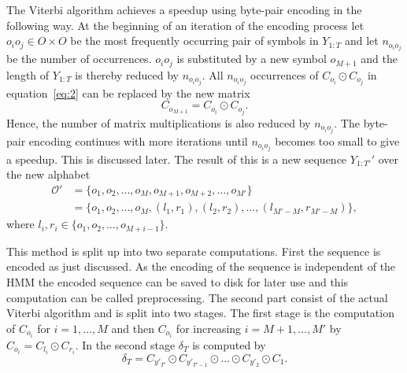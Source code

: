 The Viterbi algorithm achieves a speedup using byte-pair encoding in the
following way. At the beginning of an iteration of the encoding process let $o_i o_j \in O \times O$ be
the most frequently occurring pair of symbols in $Y_{1:T}$ and let
$n_{o_i o_j}$ be the number of occurrences. $o_i o_j$ is substituted by a new
symbol $o_{M + 1}$ and the length of $Y_{1:T}$ is thereby reduced by
$n_{o_i o_j}$. All $n_{o_i o_j}$ occurrences of $C_{o_i} \odot C_{o_j}$ in
equation~\eqref{eq:2} can be replaced by the new matrix
\begin{equation}
  \label{eq:7}
  C_{o_{M + 1}} = C_{o_i} \odot C_{o_j}.
\end{equation}
Hence, the number of matrix multiplications is also reduced by $n_{o_i o_j}$. The
byte-pair encoding continues with more iterations until $n_{o_i o_j}$ becomes
too small to give a speedup. This is discussed later. The result of this is a
new sequence $Y_{1:T'}'$ over the new alphabet
\begin{equation*}
  \begin{aligned}
    \mathcal{O}' & = \{o_1, o_2, \dots, o_M, o_{M + 1}, o_{M + 2}, \dots, o_{M'} \} \\
                 & = \{o_1, o_2, \dots, o_M, (l_1, r_1), (l_2, r_2), \dots, (l_{M' - M}, r_{M' - M}) \},
  \end{aligned}
\end{equation*}
where $l_i, r_i \in \{o_1, o_2, \dots, o_{M + i - 1} \}$.

This method is split up into two separate computations. First the sequence
is encoded as just discussed. As the encoding of the sequence is independent of
the HMM the encoded sequence can be saved to disk for later use and this computation can be
called preprocessing. The second part consist of the actual Viterbi algorithm
and is split into two stages. The first stage is the computation of
$C_{o_i}$ for $i = 1, \dots, M$ and then $C_{o_i}$ for increasing
$i = M + 1, \dots, M'$ by $C_{o_i} = C_{l_i} \odot C_{r_i}$. In the second
stage $\delta_T$ is computed by
\begin{equation}
  \label{eq:3}
  \delta_T = C_{y'_{T'}} \odot C_{y'_{T'-1}} \odot \dots \odot C_{y'_2} \odot C_1.
\end{equation}

